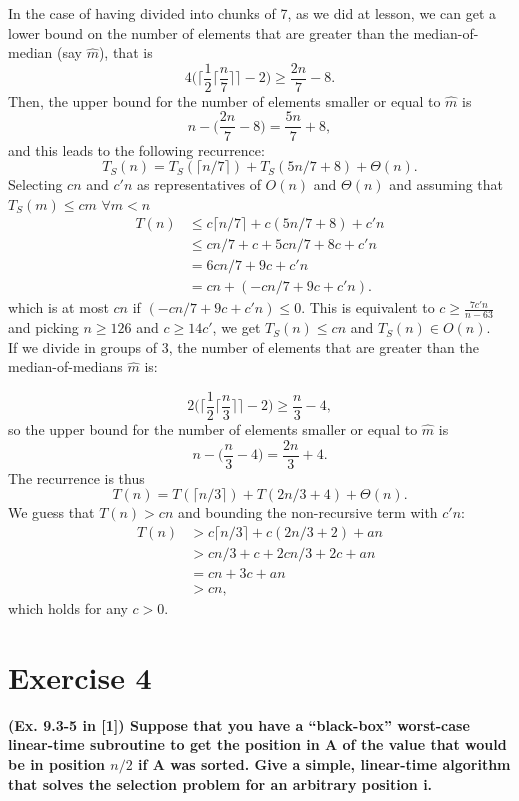 \documentclass{article}
\begin{document}
	\noindent In the case of having divided into chunks of 7, as we did at lesson, we can get a lower bound on the number of elements that are greater than the median-of-median (say $\hat{m}$), that is 
	$$
	4 \bigg(\bigg\lceil \frac{1}{2} \Big\lceil \frac{n}{7} \Big\rceil \bigg\rceil
	- 2 \bigg) \ge \frac{2n}{7} - 8.
	$$
	Then, the upper bound for the number of elements smaller or equal to $\hat{m}$ is 
	$$
	n-\Big(\frac{2n}{7} - 8\Big) = \frac{5n}{7} +8,
	$$
	and this leads to the following recurrence:
	$$
	T_S(n)=T_S(\lceil n/7 \rceil) + T_S(5n/7 + 8) + \Theta(n).
	$$
	Selecting $cn$ and $c'n$ as representatives of $O(n)$ and $\Theta(n)$ and assuming that $T_S(m) \leq cm$ $\forall m < n$ 
	\begin{align}
	\nonumber
	T(n) & \le c\lceil n/7 \rceil + c(5n/7 + 8) + c'n \\
	\nonumber
	& \le cn/7 + c + 5cn/7 + 8c + c'n \\
	\nonumber
	& = 6cn/7 + 9c + c'n \\
	\nonumber
	& = cn + (-cn/7 + 9c + c'n). 
	\end{align}
	which is at most $cn$ if $ (-cn/7 + 9c + c'n) \le 0 $. This is equivalent to $ c \ge \frac{7c'n}{n - 63}$ and picking $n\geq 126$ and $c\geq 14c'$, we get $T_S(n) \leq cn$ and $T_S(n) \in O(n)$.
	\\
	
	If we divide in groups of 3, the number of elements that are greater than the median-of-medians $\hat{m}$ is:
	
	$$
	2 \bigg(\bigg\lceil \frac{1}{2} \Big\lceil \frac{n}{3} \Big\rceil \bigg\rceil
	- 2 \bigg) \ge \frac{n}{3} - 4,
	$$
	so the upper bound for the number of elements smaller or equal to $\hat{m}$ is 
	$$
	n-\Big(\frac{n}{3} - 4\Big) = \frac{2n}{3} +4.
	$$
	The recurrence is thus 
	$$
	T(n) = T(\lceil n/3 \rceil) + T(2n/3 + 4) + \Theta(n).
	$$
	We guess that $T(n)>cn$ and bounding the non-recursive term with $c'n$:
	\begin{align}
	\nonumber
	T(n) & > c\lceil n/3 \rceil + c(2n/3 + 2) + an \\
	\nonumber
	& > cn/3 + c + 2cn/3 + 2c + an \\
	\nonumber
	& = cn + 3c + an \\
	\nonumber
	& > cn ,
	\end{align}
	which holds for any $c>0$.
	\newpage
	\section*{Exercise 4}
	\textbf{(Ex. 9.3-5 in [1]) Suppose that you have a “black-box” worst-case linear-time subroutine to get the position in A of the value that would be in position $n/2$ if A was sorted. Give a simple, linear-time algorithm that
	solves the selection problem for an arbitrary position i.}\\
\end{document}
